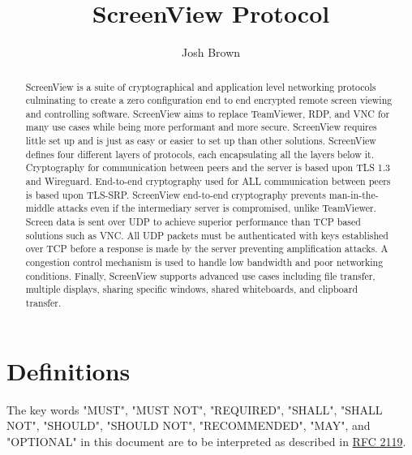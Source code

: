 \documentclass{article}
\title{\textbf{ScreenView Protocol}}
\author{Josh Brown}
\begin{document}
    \maketitle

    \begin{abstract}
        ScreenView is a suite of cryptographical and application level networking protocols culminating to create a
        zero configuration end to end encrypted remote screen viewing and controlling software. ScreenView aims to
        replace TeamViewer, RDP, and VNC for many use cases while being more performant and more secure. ScreenView
        requires little set up and is just as easy or easier to set up than other solutions. ScreenView defines four different
        layers of protocols, each encapsulating all the layers below it. Cryptography for communication between peers
        and the server is based upon TLS 1.3 and Wireguard. End-to-end cryptography used for ALL communication between
        peers is based upon TLS-SRP. ScreenView end-to-end cryptography prevents man-in-the-middle attacks even if
        the intermediary server is compromised, unlike TeamViewer. Screen data is sent over UDP to achieve superior
        performance than TCP based solutions such as VNC. All UDP packets must be authenticated with keys established
        over TCP before a response is made by the server preventing amplification attacks. A congestion control
        mechanism is used to handle low bandwidth and poor networking conditions. Finally, ScreenView supports
        advanced use cases including file transfer, multiple displays, sharing specific windows, shared whiteboards,
        and clipboard transfer.
    \end{abstract}

    \newpage

    \tableofcontents
    \newpage


    \section{Definitions}

    The key words "MUST", "MUST NOT", "REQUIRED", "SHALL", "SHALL NOT",
    "SHOULD", "SHOULD NOT", "RECOMMENDED", "MAY", and "OPTIONAL" in this
    document are to be interpreted as described in \href{https://datatracker.ietf.org/doc/html/rfc2119}{RFC 2119}.

    \newpage

    

    

    

    

    
\end{document}
